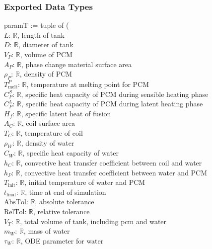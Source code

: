 \documentclass[12pt]{article}
\begin{document}

\subsubsection{Exported Data Types}

paramT := tuple of (\\
$L$: $\mathbb{R}$, length of tank\\
$D$: $\mathbb{R}$, diameter of tank\\
$V_P$: $\mathbb{R}$, volume of PCM\\
$A_P$: $\mathbb{R}$, phase change material surface area\\  
$\rho_P$: $\mathbb{R}$, density of PCM\\
$T_\text{melt}^{P}$: $\mathbb{R}$, temperature at melting point for PCM\\
$C^S_P$: $\mathbb{R}$, specific heat capacity of PCM during sensible heating phase\\
$C^L_P$: $\mathbb{R}$, specific heat capacity of PCM during latent heating phase\\
$H_f$: $\mathbb{R}$, specific latent heat of fusion\\
$A_C$: $\mathbb{R}$, coil surface area\\
$T_C$: $\mathbb{R}$, temperature of coil\\
$\rho_W$: $\mathbb{R}$, density of water\\
$C_W$: $\mathbb{R}$, specific heat capacity of water\\  
$h_C$: $\mathbb{R}$, convective heat transfer coefficient between coil and water\\
$h_P$: $\mathbb{R}$, convective heat transfer coefficient between water and PCM\\
$T_\text{init}$: $\mathbb{R}$, initial temperature of water and PCM\\
$t_\text{final}$: $\mathbb{R}$, time at end of simulation\\
$\text{AbsTol}$: $\mathbb{R}$, absolute tolerance\\
$\text{RelTol}$: $\mathbb{R}$, relative tolerance\\
$V_T$: $\mathbb{R}$, total volume of tank, including pcm and water\\
$m_W$: $\mathbb{R}$, mass of water\\
$\tau_W$: $\mathbb{R}$, ODE parameter for water\\
\end{document}
